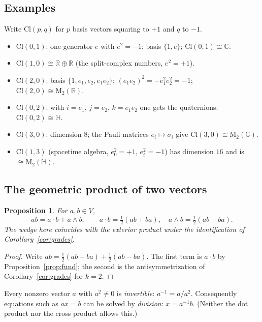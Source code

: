 \documentclass[11pt,a4paper]{article}
\newcounter{thm}[section]
\numberwithin{equation}{section}
\theoremstyle{definition}
\theoremstyle{plain}
\newtheorem{proposition}[thm]{Proposition}
\newcommand{\R}{\mathbb{R}}
\newcommand{\C}{\mathbb{C}}
\newcommand{\Hq}{\mathbb{H}}
\newcommand{\Mat}{\mathrm{M}}
\newcommand{\Cl}{\mathrm{Cl}}
\begin{document}
\subsection{Examples}

\begin{example} Write $\Cl(p,q)$ for $p$ basis vectors squaring to $+1$ and $q$ to $-1$.
\begin{itemize}
  \item $\Cl(0,1)$: one generator $e$ with $e^2=-1$; basis $\{1,e\}$; $\Cl(0,1)\cong\C$.
  \item $\Cl(1,0)\cong\R\oplus\R$ (the split-complex numbers, $e^2=+1$).
  \item $\Cl(2,0)$: basis $\{1,e_1,e_2,e_1e_2\}$; $(e_1e_2)^2=-e_1^2e_2^2=-1$; $\Cl(2,0)\cong\Mat_2(\R)$.
  \item $\Cl(0,2)$: with $i=e_1$, $j=e_2$, $k=e_1e_2$ one gets the quaternions: $\Cl(0,2)\cong\Hq$.
  \item $\Cl(3,0)$: dimension $8$; the Pauli matrices $e_i\mapsto\sigma_i$ give $\Cl(3,0)\cong\Mat_2(\C)$.
  \item $\Cl(1,3)$ (spacetime algebra, $e_0^2=+1$, $e_i^2=-1$) has dimension $16$ and is $\cong\Mat_2(\Hq)$.
\end{itemize}
\end{example}

\subsection{The geometric product of two vectors}

\begin{proposition}\label{prop:abdecomp}
For $a,b\in V$,
\begin{equation}\label{eq:abdecomp}
 ab=a\cdot b+a\wedge b,\qquad a\cdot b=\tfrac12(ab+ba),\quad a\wedge b=\tfrac12(ab-ba).
\end{equation}
The wedge here coincides with the exterior product under the identification of Corollary~\ref{cor:grades}.
\end{proposition}
\begin{proof}
Write $ab=\tfrac12(ab+ba)+\tfrac12(ab-ba)$. The first term is $a\cdot b$ by Proposition~\ref{prop:fund}; the second is the antisymmetrization of Corollary~\ref{cor:grades} for $k=2$.
\end{proof}

Every nonzero vector $a$ with $a^2\neq0$ is \emph{invertible}: $a^{-1}=a/a^2$. Consequently equations such as $ax=b$ can be solved by \emph{division}: $x=a^{-1}b$. (Neither the dot product nor the cross product allows this.)
\end{document}

